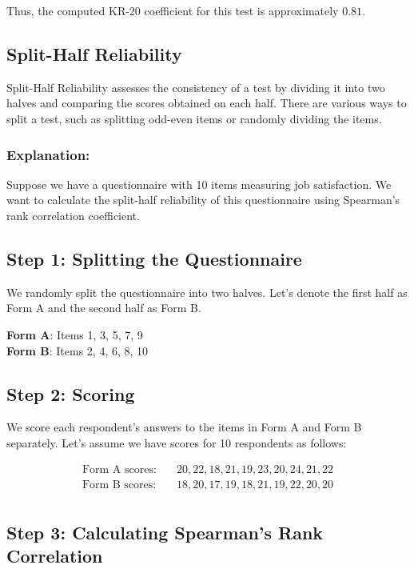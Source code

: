 \documentclass[12pt, a4paper]{exam}
\begin{document}
Thus, the computed KR-20 coefficient for this test is approximately $0.81$. 


\subsection{Split-Half Reliability}

Split-Half Reliability assesses the consistency of a test by dividing it into two halves and comparing the scores obtained on each half. There are various ways to split a test, such as splitting odd-even items or randomly dividing the items.

\subsubsection{Explanation:}

Suppose we have a questionnaire with 10 items measuring job satisfaction. We want to calculate the split-half reliability of this questionnaire using Spearman's rank correlation coefficient.

\subsection*{Step 1: Splitting the Questionnaire}

We randomly split the questionnaire into two halves. Let's denote the first half as Form A and the second half as Form B.

\textbf{Form A}: Items 1, 3, 5, 7, 9 \\
\textbf{Form B}: Items 2, 4, 6, 8, 10

\subsection*{Step 2: Scoring}

We score each respondent's answers to the items in Form A and Form B separately. Let's assume we have scores for 10 respondents as follows:

\begin{align*}
\text{Form A scores:} & \quad 20, 22, 18, 21, 19, 23, 20, 24, 21, 22 \\
\text{Form B scores:} & \quad 18, 20, 17, 19, 18, 21, 19, 22, 20, 20 \\
\end{align*}

\subsection*{Step 3: Calculating Spearman's Rank Correlation}
\end{document}
